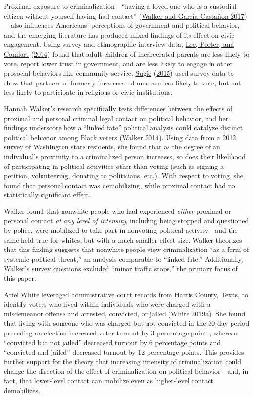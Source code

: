 \documentclass[
  12pt,
]{article}
\begin{document}
Proximal exposure to criminalization---``having a loved one who is a custodial citizen without yourself having had contact'' (\protect\hyperlink{ref-Walker2017}{Walker and García-Castañon 2017})---also influences Americans' perceptions of government and political behavior, and the emerging literature has produced mixed findings of its effect on civic engagement. Using survey and ethnographic interview data, \protect\hyperlink{ref-Lee2014}{Lee, Porter, and Comfort} (\protect\hyperlink{ref-Lee2014}{2014}) found that adult children of incarcerated parents are less likely to vote, report lower trust in government, and are less likely to engage in other prosocial behaviors like community service. \protect\hyperlink{ref-Sugie2015}{Sugie} (\protect\hyperlink{ref-Sugie2015}{2015}) used survey data to show that partners of formerly incarcerated men are less likely to vote, but not less likely to participate in religious or civic institutions.

Hannah Walker's research specifically tests differences between the effects of proximal and personal criminal legal contact on political behavior, and her findings underscore how a ``linked fate'' political analysis could catalyze distinct political behavior among Black voters (\protect\hyperlink{ref-Walker2014}{Walker 2014}). Using data from a 2012 survey of Washington state residents, she found that as the degree of an individual's proximity to a criminalized person increases, so does their likelihood of participating in political activities other than voting (such as signing a petition, volunteering, donating to politicians, etc.). With respect to voting, she found that personal contact was demobilizing, while proximal contact had no statistically significant effect.

Walker found that nonwhite people who had experienced \emph{either} proximal or personal contact \emph{at any level of intensity}, including being stopped and questioned by police, were mobilized to take part in nonvoting political activity---and the same held true for whites, but with a much smaller effect size. Walker theorizes that this finding suggests that nonwhite people view criminalization ``as a form of systemic political threat,'' an analysis comparable to ``linked fate.'' Additionally, Walker's survey questions excluded ``minor traffic stops,'' the primary focus of this paper.

Ariel White leveraged administrative court records from Harris County, Texas, to identify voters who lived within individuals who were charged with a misdemeanor offense and arrested, convicted, or jailed (\protect\hyperlink{ref-White2019}{White 2019a}). She found that living with someone who was charged but not convicted in the 30 day period preceding an election increased voter turnout by 3 percentage points, whereas ``convicted but not jailed'' decreased turnout by 6 percentage points and ``convicted and jailed'' decreased turnout by 12 percentage points. This provides further support for the theory that increasing intensity of criminalization could change the direction of the effect of criminalization on political behavior---and, in fact, that lower-level contact can mobilize even as higher-level contact demobilizes.
\end{document}
